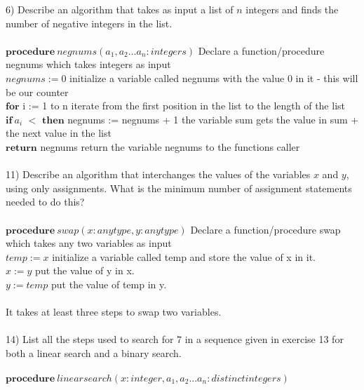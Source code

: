 \documentclass{article}
\begin{document}
\begin{flushleft}
\setlength\parindent{0pt}6) Describe an algorithm that takes as input a list of $n$ integers and finds the number of negative integers in the list. \\
~\\
\setlength\parindent{24pt}$\textbf{procedure} \: negnums(a_1, a_2 . . . a_n: integers)$ {\tiny Declare a function/procedure negnums which takes integers as input} \\
$\textit{negnums} := 0$ {\tiny initialize a variable called negnums with the value 0 in it - this will be our counter}\\
$\textbf{for}$ i := 1 to n {\tiny iterate from the first position in the list to the length of the list} \\
\setlength\parindent{48pt} $\textbf{if}\: a_i$ $< $ $\textbf{then}$ negnums := negnums + 1  {\tiny the variable sum gets the value in sum + the next value in the list}\\
\setlength\parindent{24pt}$\textbf{return}$ negnums {\tiny return the variable negnums to the functions caller} \\
~\\
\setlength\parindent{0pt}11) Describe an algorithm that interchanges the values of the variables $x$ and $y$, using only assignments.  What is the minimum number of assignment statements needed to do this? \\
~\\
\setlength\parindent{24pt}$\textbf{procedure} \: swap(x: anytype, y: anytype)$ {\tiny Declare a function/procedure swap which takes any two variables as input} \\
$\textit{temp} := x$ {\tiny initialize a variable called temp and store the value of x in it.}\\
$\textit{x} := y$ {\tiny put the value of y in x.}\\
$\textit{y} := temp$ {\tiny put the value of temp in y.}\\
~\\
\setlength\parindent{24pt}It takes at least three steps to swap two variables. \\
~\\
\setlength\parindent{0pt}14) List all the steps used to search for 7 in a sequence given in exercise 13 for both a linear search and a binary search. \\
~\\
\setlength\parindent{24pt}$\textbf{procedure} \: linear search(x: integer, a_1, a_2 . . . a_n: distinct integers)$ \\

\end{flushleft}
\end{document}
